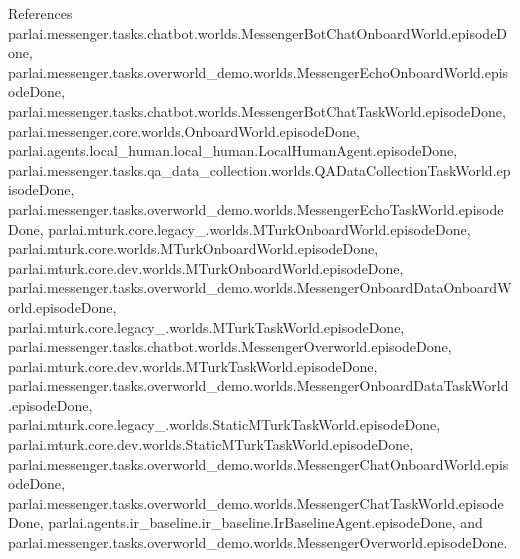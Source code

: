 References parlai.\+messenger.\+tasks.\+chatbot.\+worlds.\+Messenger\+Bot\+Chat\+Onboard\+World.\+episode\+Done, parlai.\+messenger.\+tasks.\+overworld\+\_\+demo.\+worlds.\+Messenger\+Echo\+Onboard\+World.\+episode\+Done, parlai.\+messenger.\+tasks.\+chatbot.\+worlds.\+Messenger\+Bot\+Chat\+Task\+World.\+episode\+Done, parlai.\+messenger.\+core.\+worlds.\+Onboard\+World.\+episode\+Done, parlai.\+agents.\+local\+\_\+human.\+local\+\_\+human.\+Local\+Human\+Agent.\+episode\+Done, parlai.\+messenger.\+tasks.\+qa\+\_\+data\+\_\+collection.\+worlds.\+Q\+A\+Data\+Collection\+Task\+World.\+episode\+Done, parlai.\+messenger.\+tasks.\+overworld\+\_\+demo.\+worlds.\+Messenger\+Echo\+Task\+World.\+episode\+Done, parlai.\+mturk.\+core.\+legacy\+\_.\+worlds.\+M\+Turk\+Onboard\+World.\+episode\+Done, parlai.\+mturk.\+core.\+worlds.\+M\+Turk\+Onboard\+World.\+episode\+Done, parlai.\+mturk.\+core.\+dev.\+worlds.\+M\+Turk\+Onboard\+World.\+episode\+Done, parlai.\+messenger.\+tasks.\+overworld\+\_\+demo.\+worlds.\+Messenger\+Onboard\+Data\+Onboard\+World.\+episode\+Done, parlai.\+mturk.\+core.\+legacy\+\_.\+worlds.\+M\+Turk\+Task\+World.\+episode\+Done, parlai.\+messenger.\+tasks.\+chatbot.\+worlds.\+Messenger\+Overworld.\+episode\+Done, parlai.\+mturk.\+core.\+dev.\+worlds.\+M\+Turk\+Task\+World.\+episode\+Done, parlai.\+messenger.\+tasks.\+overworld\+\_\+demo.\+worlds.\+Messenger\+Onboard\+Data\+Task\+World.\+episode\+Done, parlai.\+mturk.\+core.\+legacy\+\_.\+worlds.\+Static\+M\+Turk\+Task\+World.\+episode\+Done, parlai.\+mturk.\+core.\+dev.\+worlds.\+Static\+M\+Turk\+Task\+World.\+episode\+Done, parlai.\+messenger.\+tasks.\+overworld\+\_\+demo.\+worlds.\+Messenger\+Chat\+Onboard\+World.\+episode\+Done, parlai.\+messenger.\+tasks.\+overworld\+\_\+demo.\+worlds.\+Messenger\+Chat\+Task\+World.\+episode\+Done, parlai.\+agents.\+ir\+\_\+baseline.\+ir\+\_\+baseline.\+Ir\+Baseline\+Agent.\+episode\+Done, and parlai.\+messenger.\+tasks.\+overworld\+\_\+demo.\+worlds.\+Messenger\+Overworld.\+episode\+Done.

\mbox{\label{classparlai_1_1mturk_1_1tasks_1_1personachat_1_1personachat__rephrase_1_1worlds_1_1RephrasePersonaWorld_a10d5c2ab0c066ccbea89be4a01729415}} 
